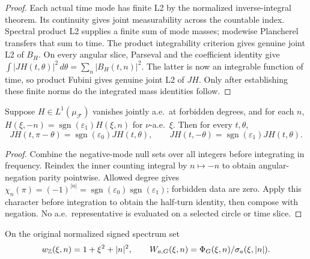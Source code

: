 \begin{proof}
\leanok
Each actual time mode has finite L2 by the normalized inverse-integral theorem.
Its continuity gives joint measurability across the countable index. Spectral
product L2 supplies a finite sum of mode masses; modewise Plancherel transfers
that sum to time. The product integrability criterion gives genuine joint L2
of $B_H$.
On every angular slice, Parseval and the coefficient identity give
$\int|JH(t,\theta)|^2\,d\theta=\sum_n|B_H(t,n)|^2$.
The latter is now an integrable function of time, so product Fubini gives genuine
joint L2 of $JH$. Only after establishing these finite norms do the integrated
mass identities follow.
\end{proof}

\begin{lemma}
\label{lem:cylinder-joint-parity}
\leanok
Suppose $H\in L^1(\mu_{\mathcal F})$ vanishes jointly a.e.\ at forbidden degrees,
and for each $n$, $H(\xi,-n)=\operatorname{sgn}(\varepsilon_1)H(\xi,n)$ for
$\nu$-a.e.\ $\xi$. Then for every $t,\theta$,
\[
 JH(t,\pi-\theta)=\operatorname{sgn}(\varepsilon_0)JH(t,\theta),\qquad
 JH(t,-\theta)=\operatorname{sgn}(\varepsilon_1)JH(t,\theta).
\]
\end{lemma}

\begin{proof}
\leanok
Combine the negative-mode null sets over all integers before integrating in
frequency. Reindex the inner counting integral by $n\mapsto-n$ to obtain
angular-negation parity pointwise.
Allowed degree gives
$\chi_n(\pi)=(-1)^{|n|}=\operatorname{sgn}(\varepsilon_0)
\operatorname{sgn}(\varepsilon_1)$; forbidden data are zero. Apply this character
before integration to obtain the half-turn identity, then compose with negation.
No a.e.\ representative is evaluated on a selected circle or time slice.
\end{proof}

\begin{definition}
\label{def:cylinder-signed-inverse}
\leanok
On the original normalized signed spectrum set
\[
 w_{\mathbb{Z}}(\xi,n)=1+\xi^2+|n|^2,\qquad
 W_{a,G}(\xi,n)=\Phi_G(\xi,n)/\sigma_a(\xi,|n|).
\]
\end{definition}


